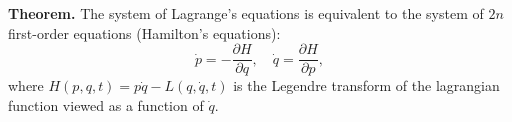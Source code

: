 \textbf{Theorem.} The system of Lagrange's equations is equivalent to the system of $2n$ first-order equations (Hamilton's equations):
$$\dot{p} = -\frac{\partial H}{\partial q}, \quad \dot{q} = \frac{\partial H}{\partial p},$$
where $H(p, q, t) = p\dot{q} - L(q, \dot{q}, t)$ is the Legendre transform of the lagrangian function viewed as a function of $\dot{q}$.
